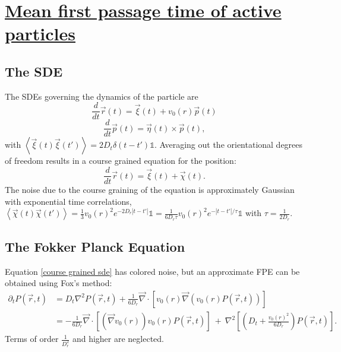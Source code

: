 \documentclass[paper=a4, fontsize=11pt]{scrartcl} %
\begin{document}

\section*{\underline{Mean first passage time of active particles}}


\subsection*{The SDE}

The SDEs governing the dynamics of the particle are
\begin{equation}\label{position sde}
\frac{d}{dt} \vec r (t) =  \vec \xi(t) +v_0(r) \vec p (t)
\end{equation}
\begin{equation}\label{oriantation sde}
\frac{d}{dt} \vec p (t) = \vec \eta (t) \times \vec p(t) ,
\end{equation}
with $\left< \vec \xi(t) \vec \xi (t') \right> = 2 D_t \delta(t-t') \mathbb{1} $. 
Averaging out the orientational degrees of freedom results in a course grained equation for the position:
\begin{equation}\label{course grained sde}
\frac{d}{dt} \vec r (t) =  \vec \xi (t) + \vec \chi (t).
\end{equation}
The noise due to the course graining of the equation is approximately Gaussian with exponential time correlations, $\left< \vec \chi (t) \vec \chi (t') \right> = \frac{1}{3} v_0(r)^2 e^{-2D_r|t-t'|} \mathbb{1} = \frac{1}{6 D_r \tau} v_0(r)^2 e^{-|t-t'|/\tau} \mathbb{1}$ with $\tau = \frac{1}{2D_r}$.

\subsection*{The Fokker Planck Equation}
Equation \ref{course grained sde} has colored noise, but an approximate FPE can be obtained using Fox's method:
\begin{align}\label{fpe}
\partial_t P(\vec r,t) & = D_t \nabla^2 P(\vec r,t) + \frac{1}{6D_r}  \vec \nabla    \cdot \left[ v_0(r) \vec \nabla \left( v_0(r) P(\vec r,t)\right) \right] \\
& = - \frac{1}{6D_r}  \vec \nabla    \cdot \left[ \left(\vec \nabla v_0(r)\right)  v_0(r) P(\vec r,t) \right] \ 
+ \ \nabla^2 \left[ \left( D_t + \frac{v_0(r)^2}{6 D_r} \right) P(\vec r,t) \right].
\end{align}
Terms of order $\frac{1}{D_r^2}$ and higher are neglected.
\end{document}
